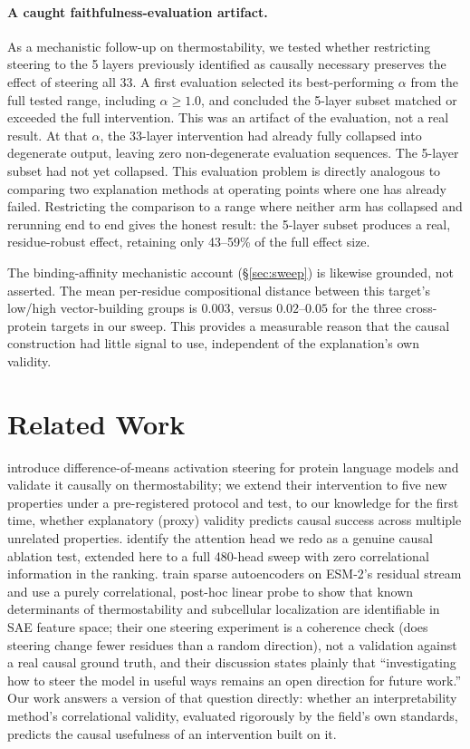 \documentclass{article}
\begin{document}
\paragraph{A caught faithfulness-evaluation artifact.} As a mechanistic
follow-up on thermostability, we tested whether restricting steering to
the 5 layers previously identified as causally necessary preserves the
effect of steering all 33. A first evaluation selected its
best-performing $\alpha$ from the full tested range, including
$\alpha\geq1.0$, and concluded the 5-layer subset matched or exceeded the
full intervention. This was an artifact of the evaluation, not a real
result. At that $\alpha$, the 33-layer intervention had already fully
collapsed into degenerate output, leaving zero non-degenerate evaluation
sequences. The 5-layer subset had not yet collapsed. This evaluation
problem is directly analogous to comparing two explanation methods at
operating points where one has already failed.
Restricting the comparison to a range where neither arm has collapsed and
rerunning end to end gives the honest result: the 5-layer subset produces
a real, residue-robust effect, retaining only 43--59\% of the full effect
size.

The binding-affinity mechanistic account (\S\ref{sec:sweep}) is likewise
grounded, not asserted. The mean per-residue compositional distance
between this target's low/high vector-building groups is $0.003$, versus
$0.02$--$0.05$ for the three cross-protein targets in our sweep. This
provides a measurable reason that the causal construction had little
signal to use, independent of the explanation's own validity.

\section{Related Work}

\citet{huang2025steering} introduce difference-of-means activation
steering for protein language models and validate it causally on
thermostability; we extend their intervention to five new properties
under a pre-registered protocol and test, to our knowledge for the first
time, whether explanatory (proxy) validity predicts causal success across
multiple unrelated properties. \citet{vig2021bertology} identify the
attention head we redo as a genuine causal ablation test, extended here
to a full 480-head sweep with zero correlational information in the
ranking. \citet{adams2025mechanistic} train sparse autoencoders on
ESM-2's residual stream and use a purely correlational, post-hoc linear
probe to show that known determinants of thermostability and subcellular
localization are identifiable in SAE
feature space; their one steering experiment is a coherence check (does
steering change fewer residues than a random direction), not a validation
against a real causal ground truth, and their discussion states plainly
that ``investigating how to steer the model in useful ways remains an
open direction for future work.'' Our work answers a version of that
question directly: whether an interpretability method's correlational
validity, evaluated rigorously by the field's own standards, predicts the
causal usefulness of an intervention built on it.
\end{document}
